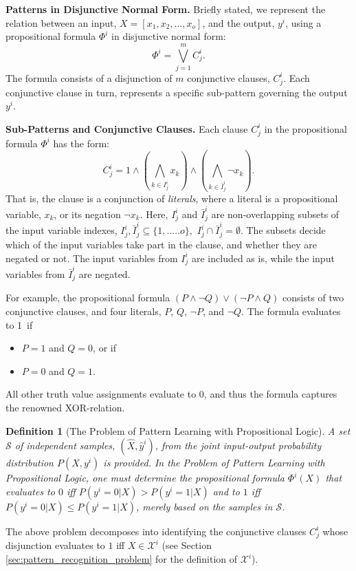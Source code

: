 \documentclass[11pt,a4paper]{article}
\newcommand{\True}{\mbox{1}}
\newcommand{\False}{\mbox{0}}
\newtheorem{definition}{Definition}
\begin{document}
{\bf Patterns in Disjunctive Normal Form.} Briefly stated, we represent the relation between an input, $X = [x_1, x_2, \ldots, x_o]$, and the output, $y^i$, using a propositional formula $\Phi^i$ in disjunctive normal form:
\begin{equation}
    \Phi^i = \bigvee_{j=1}^{m} C_j^i.
\end{equation}
The formula consists of a disjunction of $m$ conjunctive clauses, $C_j^i$. Each conjunctive clause in turn, represents a specific sub-pattern governing the output $y^i$.

{\bf Sub-Patterns and Conjunctive Clauses.} Each clause $C_j^i$ in the propositional formula $\Phi^i$ has the form:
\begin{equation}
\label{eqn:clause}
C_j^i = 1 \land \left(\bigwedge_{k \in I_j^i} x_k\right) \land \left( \bigwedge_{k \in \bar I_j^i} \lnot x_k\right).
\end{equation}
That is, the clause is a conjunction of \emph{literals}, where a literal is a propositional variable, $x_k$, or its negation $\lnot x_k$.
Here, $I_j^i$ and $\bar I_j^i$ are non-overlapping subsets of the input variable indexes, $I_j^i, \bar I_j^i \subseteq \{1,.....o\},$ $I_j^i \cap \bar I_j^i = \emptyset$. The subsets decide which of the input variables take part in the clause, and whether they are negated or not. The input variables from $I_j^i$ are included as is, while the input variables from $\bar I_j^i$ are negated.

For example, the propositional formula $(P \land \lnot Q) \lor (\lnot P \land Q)$ consists of two conjunctive clauses, and four literals, $P$, $Q$, $\lnot P$, and $\lnot Q$. The formula evaluates to \True\ if
\begin{itemize}
    \item $P = \True$ and $Q = \False$, or if
    \item $P = \False$ and $Q = \True$.
\end{itemize}
All other truth value assignments evaluate to $\False$, and thus the formula captures the renowned XOR-relation.
\begin{definition}[The Problem of Pattern Learning with Propositional Logic]\label{def:classification_problem}
A set $\mathcal{S}$ of independent samples, $(\hat X, \hat y^i)$, from the joint input-output probability distribution $P(X, y^i)$ is provided. In the Problem of Pattern Learning with Propositional Logic, one must determine the propositional formula $\Phi^i(X)$ that evaluates to $\False$ iff $P(y^i = \False | X) > P(y^i = \True | X)$ and to $\True$ iff $P(y^i = \False | X) \le P(y^i = \True | X)$, merely based on the samples in $\mathcal{S}$. 
\end{definition}
The above problem decomposes into identifying the conjunctive clauses $C_j^i$ whose disjunction evaluates to $\True$ iff $X \in \mathcal{X}^i$ (see Section \ref{sec:pattern_recognition_problem} for the definition of $\mathcal{X}^i$).
\end{document}
